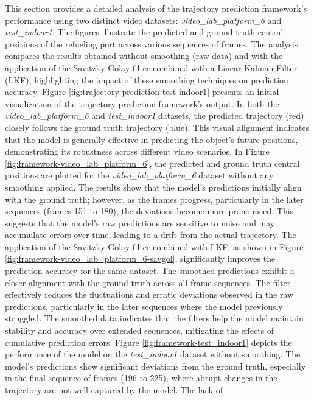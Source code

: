 \documentclass[12pt,oneside]{book} %
\begin{document}
This section provides a detailed analysis of the trajectory prediction
framework's performance using two distinct video datasets:
\textit{video\_lab\_platform\_6} and \textit{test\_indoor1}. The figures
illustrate the predicted and ground truth central positions of the refueling
port across various sequences of frames. The analysis compares the results
obtained without smoothing (raw data) and with the application of the
Savitzky-Golay filter combined with a Linear Kalman Filter (LKF), highlighting
the impact of these smoothing techniques on prediction accuracy. Figure
\ref{fig:trajectory-prediction-test-indoor1} presents an initial visualization
of the trajectory prediction framework’s output. In both the
\textit{video\_lab\_platform\_6} and \textit{test\_indoor1} datasets, the
predicted trajectory (red) closely follows the ground truth trajectory (blue).
This visual alignment indicates that the model is generally effective in
predicting the object's future positions, demonstrating its robustness across
different video scenarios. In Figure \ref{fig:framework-video_lab_platform_6},
the predicted and ground truth central positions are plotted for the
\textit{video\_lab\_platform\_6} dataset without any smoothing applied. The
results show that the model's predictions initially align with the ground
truth; however, as the frames progress, particularly in the later sequences
(frames 151 to 180), the deviations become more pronounced. This suggests that
the model's raw predictions are sensitive to noise and may accumulate errors
over time, leading to a drift from the actual trajectory. The application of
the Savitzky-Golay filter combined with LKF, as shown in Figure
\ref{fig:framework-video_lab_platform_6-savgol}, significantly improves the
prediction accuracy for the same dataset. The smoothed predictions exhibit a
closer alignment with the ground truth across all frame sequences. The filter
effectively reduces the fluctuations and erratic deviations observed in the raw
predictions, particularly in the later sequences where the model previously
struggled. The smoothed data indicates that the filters help the model maintain
stability and accuracy over extended sequences, mitigating the effects of
cumulative prediction errors. Figure \ref{fig:framework-test_indoor1} depicts
the performance of the model on the \textit{test\_indoor1} dataset without
smoothing. The model's predictions show significant deviations from the ground
truth, especially in the final sequence of frames (196 to 225), where abrupt
changes in the trajectory are not well captured by the model. The lack of
\end{document}
